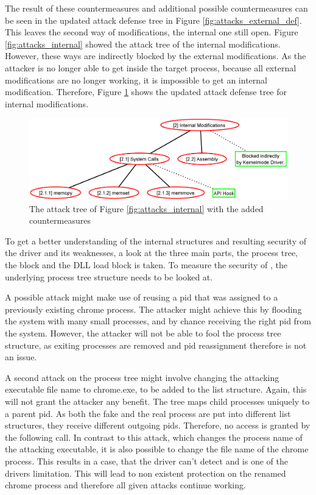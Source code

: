 The result of these countermeasures and additional possible countermeasures can be seen in the updated attack defense tree in Figure \ref{fig:attacks_external_def}. This leaves the second way of modifications, the internal one still open. Figure \ref{fig:attacks_internal} showed the attack tree of the internal modifications. However, these ways are indirectly blocked by the external modifications. As the attacker is no longer able to get inside the target process, because all external modifications are no longer working, it is impossible to get an internal modification. Therefore, Figure \ref{fig:attacks_internal_def} shows the updated attack defense tree for internal modifications.
\begin{figure}[!htbp]
\centering
\includegraphics[scale=0.25]{sections/adtrees/InternalModifications.png}
\caption{The attack tree of Figure \ref{fig:attacks_internal} with the added countermeasures}
\label{fig:attacks_internal_def}
\end{figure}

To get a better understanding of the internal structures and resulting security of the driver and its weaknesses, a look at the three main parts, the process tree, the  block and the DLL load block is taken.
To measure the security of , the underlying process tree structure needs to be looked at. 

A possible attack might make use of reusing a pid that was assigned to a previously existing chrome process. The attacker might achieve this by flooding the system with many small processes, and by chance receiving the right pid from the system. However, the attacker will not be able to fool the process tree structure, as exiting processes are removed and pid reassignment therefore is not an issue. 

A second attack on the process tree might involve changing the attacking executable file name to chrome.exe, to be added to the list structure. Again, this will not grant the attacker any benefit. The tree maps child processes uniquely to a parent pid. As both the fake and the real process are put into different list structures, they receive different outgoing pids. Therefore, no access is granted by the following  call. In contrast to this attack, which changes the process name of the attacking executable, it is also possible to change the file name of the chrome process. This results in a case, that the driver can't detect and is one of the drivers limitation. This will lead to non existent protection on the renamed chrome process and therefore all given attacks continue working.

